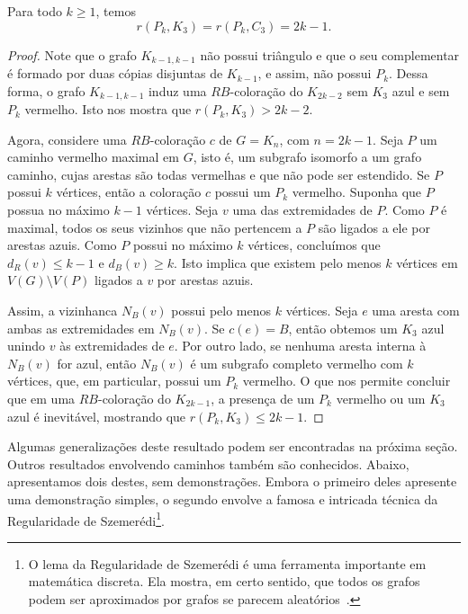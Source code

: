 \begin{proposition}
\label{graph:thm:rpt}  Para todo $k \geq 1$, temos
\[r(P_k, K_3) = r(P_k, C_3) = 2k - 1.\]
\end{proposition}
\begin{proof}
Note que o grafo $K_{k-1,k-1}$ não possui triângulo e que o seu complementar é formado por duas cópias disjuntas de $K_{k-1}$, e assim, não possui $P_k$. Dessa forma, o grafo $K_{k-1,k-1}$ induz uma $RB$-coloração do $K_{2k - 2}$ sem $K_3$ azul e sem $P_k$ vermelho. Isto nos mostra que $r(P_k, K_3) > 2k - 2$.

Agora, considere uma $RB$-coloração $c$ de $G=K_n$, com $n = 2k-1$. Seja $P$ um caminho vermelho maximal em $G$, isto é, um subgrafo isomorfo a um grafo caminho, cujas arestas são todas vermelhas e que não pode ser estendido. Se $P$ possui $k$ vértices, então a coloração $c$ possui um $P_k$ vermelho. Suponha que $P$ possua no máximo $k-1$ vértices. Seja $v$ uma das extremidades de $P$.
Como $P$ é maximal, todos os seus vizinhos que não pertencem a $P$ são ligados a ele por arestas azuis. Como $P$ possui no máximo $k$ vértices, concluímos que $d_R(v)\leq k-1$ e $d_B(v)\geq k$. Isto implica que existem pelo menos $k$ vértices em $V(G)\setminus V(P)$ ligados a $v$ por arestas azuis.

Assim, a vizinhanca $N_B(v)$ possui pelo menos $k$ vértices. Seja $e$ uma aresta com ambas as extremidades em $N_B(v)$. Se $c(e) = B$, então obtemos um $K_3$ azul unindo $v$ às extremidades de $e$. Por outro lado, se nenhuma aresta interna à $N_B(v)$ for azul, então $N_B(v)$ é um subgrafo completo vermelho com $k$ vértices, que, em particular, possui um $P_k$ vermelho. O que nos permite concluir que em uma $RB$-coloração do $K_{2k-1}$, a presença de um $P_k$ vermelho ou um $K_3$ azul é inevitável, mostrando que $r(P_k, K_3) \leq 2k-1$.
\end{proof}

Algumas generalizações deste resultado podem ser encontradas na próxima seção. Outros resultados envolvendo caminhos também são conhecidos. Abaixo, apresentamos dois destes, sem demonstrações. Embora o primeiro deles apresente uma demonstração simples, o segundo envolve a famosa e intricada técnica da Regularidade de Szemerédi\footnote{O lema da Regularidade de Szemerédi é uma ferramenta importante em matemática discreta. Ela mostra, em certo sentido, que todos os grafos podem ser aproximados por grafos se parecem aleatórios~\cite{komlos1996szemeredi}.}.

